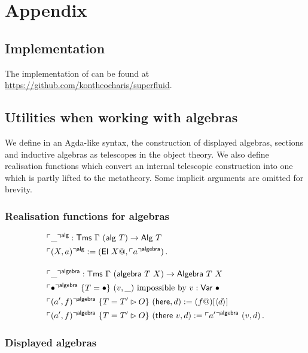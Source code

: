 \section{Appendix}

\allowdisplaybreaks

\subsection{Implementation}

The implementation of \superfluid can be found at \url{https://github.com/kontheocharis/superfluid}.

\subsection{Utilities when working with algebras} \label{app:algebras}

We define in an Agda-like syntax, the construction of displayed
algebras, sections and inductive algebras as telescopes in the object theory. We
also define realisation functions which convert an internal telescopic
construction into one which is partly lifted to the metatheory. Some implicit
arguments are omitted for brevity.

\subsubsection{Realisation functions for algebras}

\begin{fleqn}
\begin{align*}
&\emb{\_}^{\mta{alg}} : \Tms\ \Gamma\ (\mta{alg}\ T) \to \mta{Alg}\ T \\
&\emb{(X, a)}^{\mta{alg}} := (\mta{El}\ X@, \emb{a}^{\mta{algebra}}) \,. \\[1em]
&\emb{\_}^{\mta{algebra}} : \Tms\ \Gamma\ (\mta{algebra}\ T\ X) \to \mta{Algebra}\ T\ X \\
&\emb{\bullet}^{\mta{algebra}}\ \{T = \bullet\}\ (v, \_)\text{ impossible by $v : \mta{Var}\ \bullet$} \\
&\emb{(a', f)}^{\mta{algebra}}\ \{T = T' \rhd O\}\ (\mta{here}, d) := (f@)[\Msub{d}] \\
&\emb{(a', f)}^{\mta{algebra}}\ \{T = T' \rhd O\}\ (\mta{there}\ v, d) := \emb{a'}^{\mta{algebra}}\ (v, d) \,.
\end{align*}
\end{fleqn}

\subsubsection{Displayed algebras}

